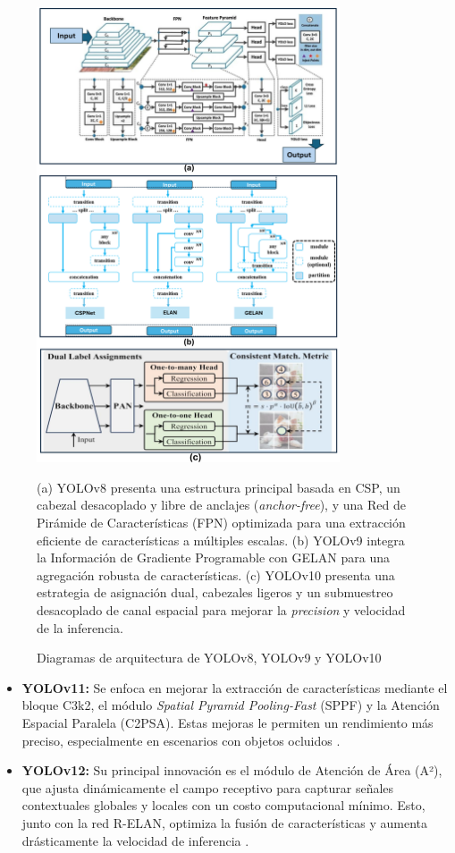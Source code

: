 \documentclass[12pt,a4paper,onecolumn,oneside]{report}
\begin{document}
\begin{figure}[htbp]
  \centering
  \includegraphics[width=0.8\textwidth]{figuras/arquitecture YOLO/v8_v9_v10.png}
  \caption{Diagramas de arquitectura de YOLOv8, YOLOv9 y YOLOv10}
  \label{fig:Yolov8_v9_v10_arquitectures}
  (a) YOLOv8 presenta una estructura principal basada en CSP, un cabezal desacoplado y libre de anclajes (\textit{anchor-free}), y una Red de Pirámide de Características (FPN) optimizada para una extracción eficiente de características a múltiples escalas. 
  (b) YOLOv9 integra la Información de Gradiente Programable con GELAN para una agregación robusta de características.
  (c) YOLOv10 presenta una estrategia de asignación dual, cabezales ligeros y un submuestreo desacoplado de canal espacial para mejorar la \textit{precision} y velocidad de la inferencia.
\end{figure}

\begin{itemize}
  \item \textbf{YOLOv11:} Se enfoca en mejorar la extracción de características mediante el bloque C3k2, el módulo \textit{Spatial Pyramid Pooling-Fast} (SPPF) y la Atención Espacial Paralela (C2PSA). Estas mejoras le permiten un rendimiento más preciso, especialmente en escenarios con objetos ocluidos \cite{defyolos}.
  \item \textbf{YOLOv12:} Su principal innovación es el módulo de Atención de Área (A²), que ajusta dinámicamente el campo receptivo para capturar señales contextuales globales y locales con un costo computacional mínimo. Esto, junto con la red R-ELAN, optimiza la fusión de características y aumenta drásticamente la velocidad de inferencia \cite{defyolos}.
\end{itemize}
\end{document}
